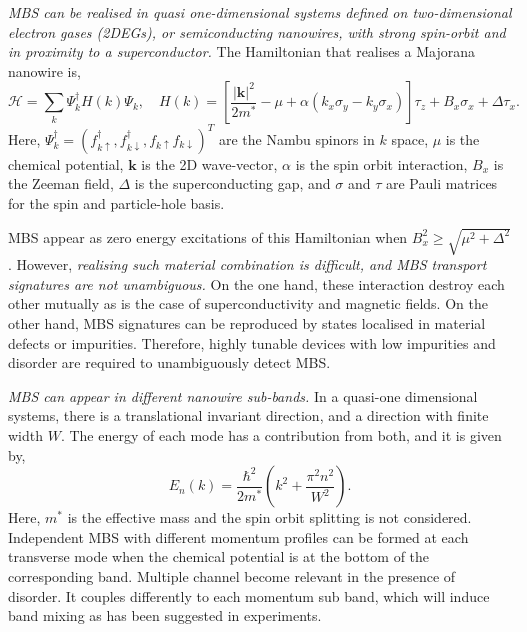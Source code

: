 \textit{MBS can be realised in quasi one-dimensional systems defined on two-dimensional electron gases (2DEGs), or semiconducting nanowires, with strong spin-orbit and in proximity to a superconductor.}
The Hamiltonian that realises a Majorana nanowire is,
\begin{equation}\label{eq:ham_maj}
\mathcal{H} = \sum_k \Psi_k^\dagger H(k) \Psi_k  ,\quad H(k) =  \left[ \frac{|\mathbf{k}|^2}{2 m^*} - \mu + \alpha(k_x \sigma_y - k_y \sigma_x) \right] \tau_z + B_x \sigma_x  + \Delta \tau_x.
\end{equation}
Here, $\Psi_k^\dagger = (f_{k\uparrow}^\dagger, f_{k\downarrow}^\dagger, f_{k\uparrow} f_{k\downarrow})^T$ are the Nambu spinors in $k$ space, $\mu$ is the chemical potential, $\mathbf{k}$ is the 2D wave-vector, $\alpha$ is the spin orbit interaction, $B_x$ is the Zeeman field, $\Delta$ is the superconducting gap, and $\sigma$ and $\tau$ are Pauli matrices for the spin and particle-hole basis.

MBS appear as zero energy excitations of this Hamiltonian when $B_x^2 \geq \sqrt{\mu^2 + \Delta^2}$.
However, \textit{realising such material combination is difficult, and MBS transport signatures are not unambiguous.}
On the one hand, these interaction destroy each other mutually as is the case of superconductivity and magnetic fields.
On the other hand, MBS signatures can be reproduced by states localised in material defects or impurities.
Therefore, highly tunable devices with low impurities and disorder are required to unambiguously detect MBS.

\textit{MBS can appear in different nanowire sub-bands.}
In a quasi-one dimensional systems, there is a translational invariant direction, and a direction with finite width $W$.
The energy of each mode has a contribution from both, and it is given by,
\begin{equation}
E_{n}(k) = \frac{\hbar^{2}}{2m^*} \left( k^{2} + \frac{\pi^{2} n^{2}}{W^{2}} \right).
\end{equation}
Here, $m^{*}$ is the effective mass and the spin orbit splitting is not considered.
Independent MBS with different momentum profiles can be formed at each transverse mode when the chemical potential is at the bottom of the corresponding band.
Multiple channel become relevant in the presence of disorder.
It couples differently to each momentum sub band, which will induce band mixing as has been suggested in experiments.

